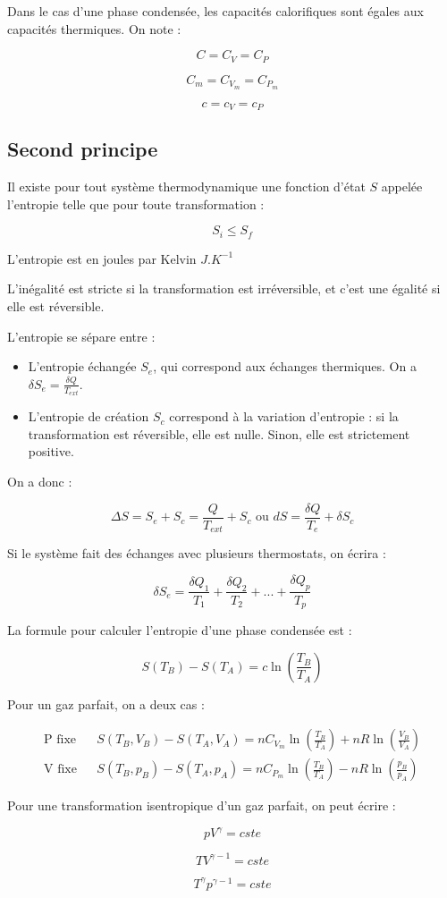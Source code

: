 \documentclass[a4paper,12pt]{book}
\newcommand{\Thr}[2]{\begin{tcolorbox}[sharp corners, colback=white,colframe=red!10!blue!30!green!75!, title=Théorème : #1]#2\end{tcolorbox}}
\begin{document}
\Thr{Pour une phase condensée}{Dans le cas d'une phase condensée, les capacités calorifiques sont égales aux capacités thermiques. On note :
\par $$C = C_V =C_P$$
\par $$C_m = C_{V_m} = C_{P_m}$$
\par $$c = c_V = c_P$$}

\subsection{Second principe}
\Thr{Second principe de la thermodynamique}{Il existe pour tout système thermodynamique une fonction d'état $S$ appelée l'entropie telle que pour toute transformation :
\par $$S_i\leq S_f$$
\par L'entropie est en joules par Kelvin $J.K^{-1}$
\par L'inégalité est stricte si la transformation est irréversible, et c'est une égalité si elle est réversible.
\par L'entropie se sépare entre :\begin{itemize}
\item L'entropie échangée $S_e$, qui correspond aux échanges thermiques. On a $\delta S_e=\frac{\delta Q}{T_{ext}}$.
\item L'entropie de création $S_c$ correspond à la variation d'entropie : si la transformation est réversible, elle est nulle. Sinon, elle est strictement positive.
\end{itemize}
\par On a donc :
\par $$\Delta S = S_e +S_c = \frac{Q}{T_{ext}}+ S_c\text{ ou }dS = \dfrac{\delta Q}{T_e}+\delta S_c$$}
\Thr{}{Si le système fait des échanges avec plusieurs thermostats, on écrira :
\par $$\delta S_e = \frac{\delta Q_1}{T_1}+\frac{\delta Q_2}{T_2}+...+\frac{\delta Q_p}{T_p}$$}
\Thr{Calcul d'entropie}{La formule pour calculer l'entropie d'une phase condensée est :
\par $$S(T_B) - S(T_A)=c\ln\left(\frac{T_B}{T_A}\right)$$
\par Pour un gaz parfait, on a deux cas :
\par \begin{align*}
\text{P fixe} && S(T_B, V_B)-S(T_A, V_A) = nC_{V_m}\ln\left(\frac{T_B}{T_A}\right)+nR\ln\left(\frac{V_B}{V_A}\right)\\
\text{V fixe} && S(T_B, p_B)-S(T_A, p_A) = nC_{P_m}\ln\left(\frac{T_B}{T_A}\right)-nR\ln\left(\frac{p_B}{p_A}\right)
\end{align*}}
\Thr{Loi de Laplace}{Pour une transformation isentropique d'un gaz parfait, on peut écrire :
\par $$pV^\gamma = cste$$
\par $$TV^{\gamma-1}=cste$$
\par $$T^\gamma p^{\gamma-1}=cste$$}
\end{document}
